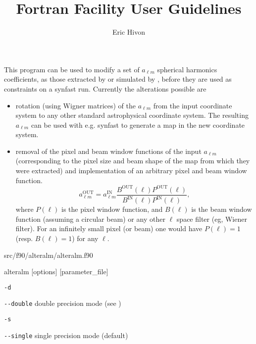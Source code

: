
\sloppy


\title{\healpix Fortran Facility User Guidelines}
 \section[alteralm]{\nosectionname}
\label{fac:alteralm}
\author{Eric Hivon}

\begin{facility}
{This program can be used to modify a set of $a_{\ell m}$ spherical harmonics
  coefficients, as those extracted by  or 
  simulated by , before
  they are used as constraints on a synfast run. Currently the alterations
  possible are %
\begin{itemize}
    \item rotation (using Wigner matrices) of the $a_{\ell m}$ from the input
    coordinate system to any other standard astrophysical coordinate system. The
    resulting $a_{\ell m}$ can be used with e.g. synfast to generate a map in the
    new coordinate system.
    \item removal of the pixel and beam window functions of the input
  $a_{\ell m}$ (corresponding to the pixel size and beam shape of the map from which
  they were extracted) and implementation of an arbitrary pixel and beam window
  function.
 \begin{equation} a_{\ell m}^\mathrm{OUT} = a_{\ell m}^\mathrm{IN} 
 \frac{B^\mathrm{OUT}(\ell) P^\mathrm{OUT}(\ell)}{B^\mathrm{IN}(\ell) 
 P^\mathrm{IN}(\ell)}, \label{eq:alteralm} \end{equation}
where $P(\ell)$ is the pixel window function, and $B(\ell)$ is the beam window
 function (assuming a circular beam) or any other $\ell$ space filter (eg,
 Wiener filter). For an infinitely small pixel (or beam) one would have $P(\ell) =
 1$ (resp. $B(\ell) = 1$) for any $\ell$.
\end{itemize}%
}%
{src/f90/alteralm/alteralm.f90}
\end{facility}

\begin{f90facility}
{alteralm [options] [parameter\_file]}
\end{f90facility}

\begin{options}
  \begin{optionlistwide}{} %
    \item[{\tt -d}]
    \item[{\tt -}{\tt -}{\tt double}] double precision mode (see 
)
    \item[{\tt -s}]
    \item[{\tt -}{\tt -}{\tt single}] single precision mode (default)
  \end{optionlistwide}
\end{options}

